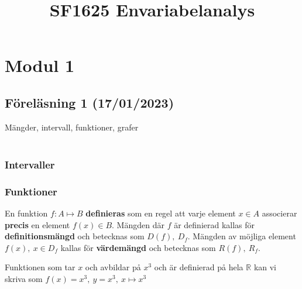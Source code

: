 \documentclass{report}
\title{\Huge{SF1625 Envariabelanalys}}
\author{\huge{}}
\date{}
\begin{document}
\maketitle
\newpage
{}
\tableofcontents
	\pagebreak

\chapter{Modul 1}

\section{Föreläsning 1 (17/01/2023)}
Mängder, intervall, funktioner, grafer \\\\

\subsection{Intervaller}

\nt{ \textbf{Halvöppet}  intervall: $ (a,b] = \{x : a < x \le b\}$ }

\subsection{Funktioner}

{
	En funktion $ f: A \mapsto B $ \textbf{definieras} som en regel att varje element $ x \in A $ associerar \textbf{precis} en element $ f(x) \in B $. Mängden där $ f $ är definierad kallas för \textbf{definitionsmängd} och betecknas som $ D(f),\:D_f $. Mängden av möjliga element $ f(x),\:x \in D_f $ kallas för \textbf{värdemängd} och betecknas som $ R(f),\:R_f $.   
}

\ex{}
{
Funktionen som tar $ x $ och avbildar på $ x^3 $ och är definierad på hela $ \mathbb{R} $ kan vi skriva som $ f(x) = x^3,\:y = x^3,\: x \mapsto x^3 $ 
}


\pagebreak
\end{document}
